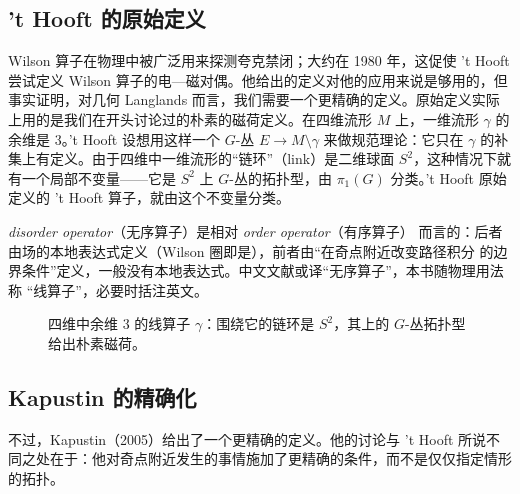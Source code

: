 \subsection{\texorpdfstring{'t Hooft}{'t Hooft} 的原始定义}

Wilson 算子在物理中被广泛用来探测夸克禁闭；大约在 1980 年，这促使 't Hooft 尝试定义 Wilson 算子的电—磁对偶。他给出的定义对他的应用来说是够用的，但事实证明，对几何 Langlands 而言，我们需要一个更精确的定义。原始定义实际上用的是我们在开头讨论过的朴素的磁荷定义。在四维流形 $M$ 上，一维流形 $\gamma$ 的余维是 $3$。't Hooft 设想用这样一个 $G$-丛 $E\to M\setminus\gamma$ 来做规范理论：它只在 $\gamma$ 的补集上有定义。由于四维中一维流形的“链环”（link）是二维球面 $S^2$，这种情况下就有一个局部不变量——它是 $S^2$ 上 $G$-丛的拓扑型，由 $\pi_1(G)$ 分类。't Hooft 原始定义的 't Hooft 算子，就由这个不变量分类。

\begin{yizhu}
\textit{disorder operator}（无序算子）是相对 \textit{order operator}（有序算子）
而言的：后者由场的本地表达式定义（Wilson 圈即是），前者由“在奇点附近改变路径积分
的边界条件”定义，一般没有本地表达式。中文文献或译“无序算子”，本书随物理用法称
“线算子”，必要时括注英文。
\end{yizhu}


\begin{figure}[htbp]
\centering
{}
\caption{四维中余维 $3$ 的线算子 $\gamma$：围绕它的链环是 $S^2$，其上的 $G$-丛拓扑型给出朴素磁荷。}
\label{fig:link}
\end{figure}

\subsection{Kapustin 的精确化}

不过，Kapustin（2005）给出了一个更精确的定义。他的讨论与 't Hooft 所说不同之处在于：他对奇点附近发生的事情施加了更精确的条件，而不是仅仅指定情形的拓扑。

